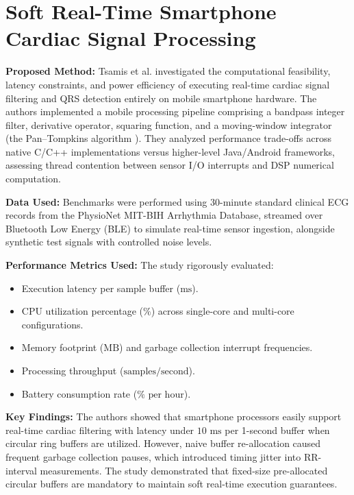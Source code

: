 \newpage
\section{Soft Real-Time Smartphone Cardiac Signal Processing \cite{tsamis2017soft}}

\textbf{Proposed Method:} Tsamis et al. \cite{tsamis2017soft} investigated the computational feasibility, latency constraints, and power efficiency of executing real-time cardiac signal filtering and QRS detection entirely on mobile smartphone hardware. The authors implemented a mobile processing pipeline comprising a bandpass integer filter, derivative operator, squaring function, and a moving-window integrator (the Pan--Tompkins algorithm \cite{pan1985real}). They analyzed performance trade-offs across native C/C++ implementations versus higher-level Java/Android frameworks, assessing thread contention between sensor I/O interrupts and DSP numerical computation.

\textbf{Data Used:} Benchmarks were performed using 30-minute standard clinical ECG records from the PhysioNet MIT-BIH Arrhythmia Database, streamed over Bluetooth Low Energy (BLE) to simulate real-time sensor ingestion, alongside synthetic test signals with controlled noise levels.

\textbf{Performance Metrics Used:} The study rigorously evaluated:
\begin{itemize}
    \item Execution latency per sample buffer ($\text{ms}$).
    \item CPU utilization percentage ($\%$) across single-core and multi-core configurations.
    \item Memory footprint ($\text{MB}$) and garbage collection interrupt frequencies.
    \item Processing throughput ($\text{samples/second}$).
    \item Battery consumption rate ($\%\text{ per hour}$).
\end{itemize}

\textbf{Key Findings:} The authors showed that smartphone processors easily support real-time cardiac filtering with latency under $10\text{ ms}$ per 1-second buffer when circular ring buffers are utilized. However, naive buffer re-allocation caused frequent garbage collection pauses, which introduced timing jitter into RR-interval measurements. The study demonstrated that fixed-size pre-allocated circular buffers are mandatory to maintain soft real-time execution guarantees.

